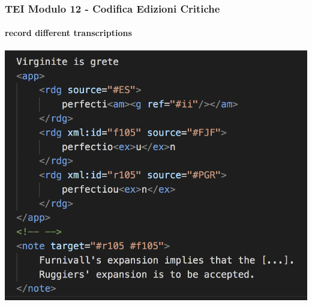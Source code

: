 \begin{frame}
    \frametitle{TEI Modulo 12 - Codifica Edizioni Critiche}
    \framesubtitle{record different transcriptions}
    \addtocounter{nframe}{1}
    



    \begin{center}
       \includegraphics[width=.95\textwidth]{imgs/app-trascrizion-note.png}
    \end{center}

\end{frame}



